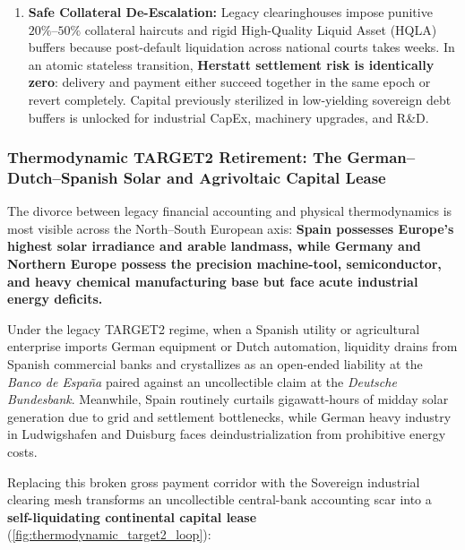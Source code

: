 \documentclass[a4paper,11pt,twoside,parskip=half-,headings=small]{scrartcl}
\begin{document}
\begin{enumerate}[nosep]
\begin{itemize}[nosep]
  \end{itemize}
  \item \textbf{Safe Collateral De-Escalation:} Legacy clearinghouses impose punitive $20\%$--$50\%$ collateral haircuts and rigid High-Quality Liquid Asset (HQLA) buffers because post-default liquidation across national courts takes weeks. In an atomic stateless transition, \textbf{Herstatt settlement risk is identically zero}: delivery and payment either succeed together in the same epoch or revert completely. Capital previously sterilized in low-yielding sovereign debt buffers is unlocked for industrial CapEx, machinery upgrades, and R\&D.
\end{enumerate}

\subsubsection{Thermodynamic TARGET2 Retirement: The German--Dutch--Spanish Solar and Agrivoltaic Capital Lease}
\label{sec:thermodynamic_target2}

The divorce between legacy financial accounting and physical thermodynamics is most visible across the North--South European axis: \textbf{Spain possesses Europe's highest solar irradiance and arable landmass, while Germany and Northern Europe possess the precision machine-tool, semiconductor, and heavy chemical manufacturing base but face acute industrial energy deficits.}

Under the legacy TARGET2 regime, when a Spanish utility or agricultural enterprise imports German equipment or Dutch automation, liquidity drains from Spanish commercial banks and crystallizes as an open-ended liability at the \emph{Banco de Espa\~na} paired against an uncollectible claim at the \emph{Deutsche Bundesbank}. Meanwhile, Spain routinely curtails gigawatt-hours of midday solar generation due to grid and settlement bottlenecks, while German heavy industry in Ludwigshafen and Duisburg faces deindustrialization from prohibitive energy costs.

Replacing this broken gross payment corridor with the Sovereign industrial clearing mesh transforms an uncollectible central-bank accounting scar into a \textbf{self-liquidating continental capital lease} (\cref{fig:thermodynamic_target2_loop}):
\end{document}
